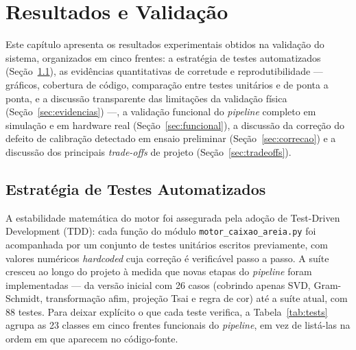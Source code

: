 
\chapter{Resultados e Validação}
\label{cap:resultados}

Este capítulo apresenta os resultados experimentais obtidos na
validação do sistema, organizados em cinco frentes: a estratégia de
testes automatizados (Seção~\ref{sec:tdd}), as evidências quantitativas
de corretude e reprodutibilidade — gráficos, cobertura de código,
comparação entre testes unitários e de ponta a ponta, e a discussão
transparente das limitações da validação física
(Seção~\ref{sec:evidencias}) —, a validação funcional do
\textit{pipeline} completo em simulação e em hardware real
(Seção~\ref{sec:funcional}), a discussão da correção do defeito de
calibração detectado em ensaio preliminar (Seção~\ref{sec:correcao}) e
a discussão dos principais \emph{trade-offs} de projeto
(Seção~\ref{sec:tradeoffs}).

\section{Estratégia de Testes Automatizados}
\label{sec:tdd}

A estabilidade matemática do motor foi assegurada pela adoção de
Test-Driven Development (TDD): cada função do módulo
\texttt{motor\_caixao\_areia.py} foi acompanhada por um conjunto de
testes unitários escritos previamente, com valores numéricos
\emph{hardcoded} cuja correção é verificável passo a passo. A suíte
cresceu ao longo do projeto à medida que novas etapas do
\textit{pipeline} foram implementadas — da versão inicial com 26 casos
(cobrindo apenas SVD, Gram-Schmidt, transformação afim, projeção Tsai e
regra de cor) até a suíte atual, com 88 testes. Para deixar
explícito o que cada teste verifica, a Tabela~\ref{tab:tests}
agrupa as 23 classes em cinco frentes funcionais do \textit{pipeline},
em vez de listá-las na ordem em que aparecem no código-fonte.

